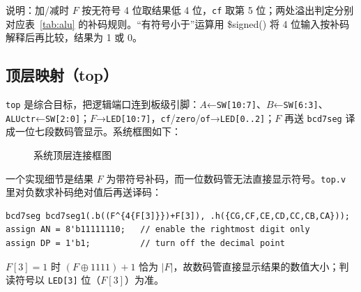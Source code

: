 \documentclass[12pt, a4paper]{ctexart}
\begin{document}
\noindent 说明：加/减时 $F$ 按无符号 4 位取结果低 4 位，\texttt{cf} 取第 5 位；两处溢出判定分别对应表~\ref{tab:alu} 的补码规则。``有符号小于''运算用 \$signed() 将 4 位输入按补码解释后再比较，结果为 1 或 0。

\subsection{顶层映射（top）}
\texttt{top} 是综合目标，把逻辑端口连到板级引脚：$A$←\texttt{SW[10:7]}、$B$←\texttt{SW[6:3]}、\texttt{ALUctr}←\texttt{SW[2:0]}；$F$→\texttt{LED[10:7]}，\texttt{cf}/\texttt{zero}/\texttt{of}→\texttt{LED[0..2]}；$F$ 再送 \texttt{bcd7seg} 译成一位七段数码管显示。系统框图如下：

\begin{figure}[htbp]
    \centering
    \caption{系统顶层连接框图}
\end{figure}

一个实现细节是结果 $F$ 为带符号补码，而一位数码管无法直接显示符号。\texttt{top.v} 里对负数求补码绝对值后再送译码：
\begin{lstlisting}
bcd7seg bcd7seg1(.b((F^{4{F[3]}})+F[3]), .h({CG,CF,CE,CD,CC,CB,CA}));
assign AN = 8'b11111110;   // enable the rightmost digit only
assign DP = 1'b1;          // turn off the decimal point
\end{lstlisting}
$F[3]=1$ 时 $(F\oplus 1111)+1$ 恰为 $|F|$，故数码管直接显示结果的数值大小；判读符号以 \texttt{LED[3]} 位（$F[3]$）为准。
\end{document}

